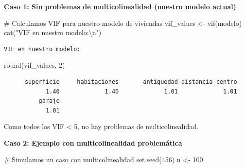 \documentclass[
  letterpaper,
  DIV=11,
  numbers=noendperiod]{scrreprt}
\newenvironment{Shaded}{\begin{snugshade}}{\end{snugshade}}
\newcommand{\CommentTok}[1]{\textcolor[rgb]{0.37,0.37,0.37}{#1}}
\newcommand{\DecValTok}[1]{\textcolor[rgb]{0.68,0.00,0.00}{#1}}
\newcommand{\FunctionTok}[1]{\textcolor[rgb]{0.28,0.35,0.67}{#1}}
\newcommand{\NormalTok}[1]{\textcolor[rgb]{0.00,0.23,0.31}{#1}}
\newcommand{\OtherTok}[1]{\textcolor[rgb]{0.00,0.23,0.31}{#1}}
\newcommand{\SpecialCharTok}[1]{\textcolor[rgb]{0.37,0.37,0.37}{#1}}
\newcommand{\StringTok}[1]{\textcolor[rgb]{0.13,0.47,0.30}{#1}}
\begin{document}
\begin{tcolorbox}[enhanced jigsaw, leftrule=.75mm, breakable, colbacktitle=quarto-callout-tip-color!10!white, bottomrule=.15mm, colframe=quarto-callout-tip-color-frame, toprule=.15mm, colback=white, coltitle=black, bottomtitle=1mm, left=2mm, title=\textcolor{quarto-callout-tip-color}{\faLightbulb}\hspace{0.5em}{Ejemplo: Diagnóstico de multicolinealidad}, opacityback=0, arc=.35mm, opacitybacktitle=0.6, toptitle=1mm, titlerule=0mm, rightrule=.15mm]

\textbf{Caso 1: Sin problemas de multicolinealidad (nuestro modelo
actual)}

\begin{Shaded}
\begin{Highlighting}[]
\CommentTok{\# Calculamos VIF para nuestro modelo de viviendas}
\NormalTok{vif\_values }\OtherTok{\textless{}{-}} \FunctionTok{vif}\NormalTok{(modelo)}
\FunctionTok{cat}\NormalTok{(}\StringTok{"VIF en nuestro modelo:}\SpecialCharTok{\textbackslash{}n}\StringTok{"}\NormalTok{)}
\end{Highlighting}
\end{Shaded}

\begin{verbatim}
VIF en nuestro modelo:
\end{verbatim}

\begin{Shaded}
\begin{Highlighting}[]
\FunctionTok{round}\NormalTok{(vif\_values, }\DecValTok{2}\NormalTok{)}
\end{Highlighting}
\end{Shaded}

\begin{verbatim}
      superficie     habitaciones       antiguedad distancia_centro 
            1.40             1.40             1.01             1.01 
          garaje 
            1.01 
\end{verbatim}

Como todos los VIF \textless{} 5, no hay problemas de multicolinealidad.

\textbf{Caso 2: Ejemplo con multicolinealidad problemática}

\begin{Shaded}
\begin{Highlighting}[]
\CommentTok{\# Simulamos un caso con multicolinealidad}
\FunctionTok{set.seed}\NormalTok{(}\DecValTok{456}\NormalTok{)}
\NormalTok{n }\OtherTok{\textless{}{-}} \DecValTok{100}


\end{Highlighting}
\end{Shaded}
\end{tcolorbox}
\end{document}
